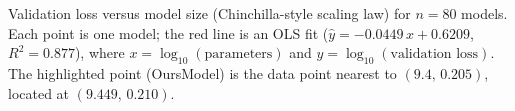 \caption{Validation loss versus model size (Chinchilla-style scaling law) for $n{=}80$ models. Each point is one model; the red line is an OLS fit ($\hat{y} = -0.0449\,x + 0.6209$, $R^{2}=0.877$), where $x=\log_{10}(\text{parameters})$ and $y=\log_{10}(\text{validation loss})$. The highlighted point (OursModel) is the data point nearest to $(9.4,\,0.205)$, located at $(9.449,\,0.210)$.}
